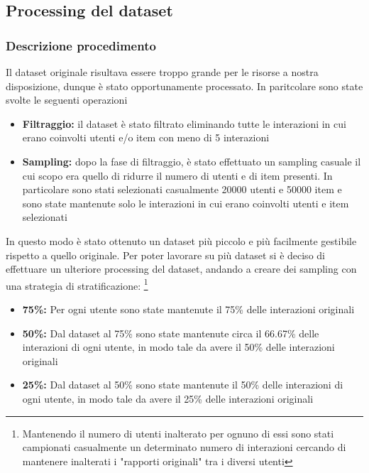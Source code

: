 \subsection{Processing del dataset}

\subsubsection{Descrizione procedimento}

\noindent Il dataset originale risultava essere troppo grande per le risorse a nostra disposizione, dunque è stato opportunamente processato. In paritcolare sono state svolte le seguenti operazioni
\begin{itemize}
    \item \textbf{Filtraggio:} il dataset è stato filtrato eliminando tutte le interazioni in cui erano coinvolti utenti e/o item con meno di 5 interazioni
    \item \textbf{Sampling:} dopo la fase di filtraggio, è stato effettuato un sampling casuale il cui scopo era quello di ridurre il numero di utenti e di item presenti. In particolare sono stati selezionati casualmente 20000 utenti e 50000 item e sono state mantenute solo le interazioni in cui erano coinvolti utenti e item selezionati
\end{itemize}

\noindent In questo modo è stato ottenuto un dataset più piccolo e più facilmente gestibile rispetto a quello originale.
Per poter lavorare su più dataset si è deciso di effettuare un ulteriore processing del dataset, andando a creare dei sampling con una strategia di stratificazione: \footnote{{{Mantenendo il numero di utenti inalterato per ognuno di essi sono stati campionati casualmente un determinato numero di interazioni cercando di mantenere inalterati i "rapporti originali" tra i diversi utenti}}}{}
\begin{itemize}
    \item \textbf{75\%:} Per ogni utente sono state mantenute il 75\% delle interazioni originali
    \item \textbf{50\%:} Dal dataset al 75\% sono state mantenute circa il 66.67\% delle interazioni di ogni utente, in modo tale da avere il 50\% delle interazioni originali
    \item \textbf{25\%:} Dal dataset al 50\% sono state mantenute il 50\% delle interazioni di ogni utente, in modo tale da avere il 25\% delle interazioni originali
\end{itemize}

